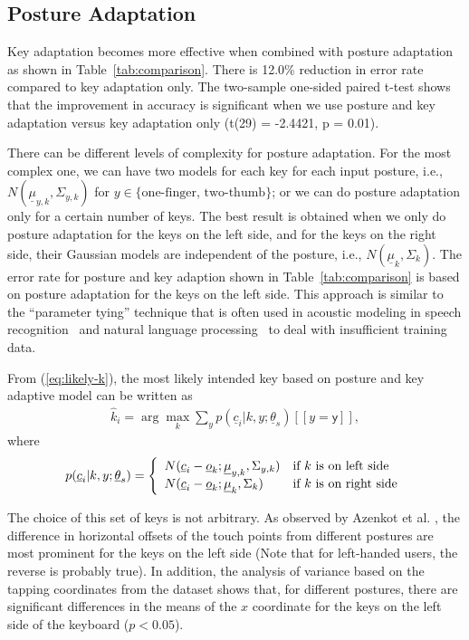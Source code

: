 \documentclass{sigchi}
\begin{document}
\subsection{Posture Adaptation}
Key adaptation becomes more effective when combined with posture adaptation as
shown in Table~\ref{tab:comparison}. There is 12.0\% reduction in error rate 
compared to key adaptation only. The two-sample one-sided paired t-test shows
that the improvement in accuracy is significant when we use posture and key 
adaptation versus key adaptation only (t(29) = -2.4421, p = 0.01).

There can be different levels of complexity for posture adaptation. For the most complex one, we can have
two models for each key for each input posture, i.e., $N(\underline \mu_{y,k}, \Sigma_{y,k})$ for $y \in
\{\text{one-finger, two-thumb}\}$; or we can do posture adaptation only for a certain
number of keys. The best result is obtained when we only do posture adaptation for the keys on 
the left side, and for the keys on the right side, their Gaussian models are
independent of the posture, i.e., $N(\underline\mu_k, \Sigma_k)$.
The error rate for posture and key adaption shown in Table~\ref{tab:comparison} is based on 
posture adaptation for the keys on the left side. This approach is similar to the ``parameter tying'' technique that is often used in acoustic modeling in speech recognition~\cite{Bellegarda:1989} and natural language processing~\cite{Lin:1995} to deal with insufficient training data.

From (\ref{eq:likely-k}), the most likely intended key based on posture and key adaptive model can be written as
\begin{align}          
\hat k_i = \arg\max_k \sum_{y} p(\underline c_i | k, y; \underline\theta_s)[[y = \textsf{y}]],
\end{align}
where
\begin{align}
p(\underline c_i | k, y; \underline\theta_s) = \left\{
  \begin{array}{l l}
  N(\underline c_i - \underline o_k; \underline \mu_{y, k}, \Sigma_{y,k}) & \text{if $k$ is on left side} \\
  N(\underline c_i - \underline o_k; \underline \mu_{k}, \Sigma_{k}) & \text{if $k$ is on right side} \\
\end{array} \right.
\end{align}

The choice of this set of keys is not arbitrary. As observed by Azenkot et al. \cite{Azenkot:2012}, the difference in horizontal
offsets of the touch points from different postures are most prominent for the keys on the
left side (Note that for left-handed users, the reverse is probably true). 
In addition, the analysis of variance based on the tapping coordinates from the
dataset shows that, for different postures, there are significant differences in the means of
the $x$ coordinate for the keys on the left side of the keyboard ($p < 0.05$). 
\end{document}
